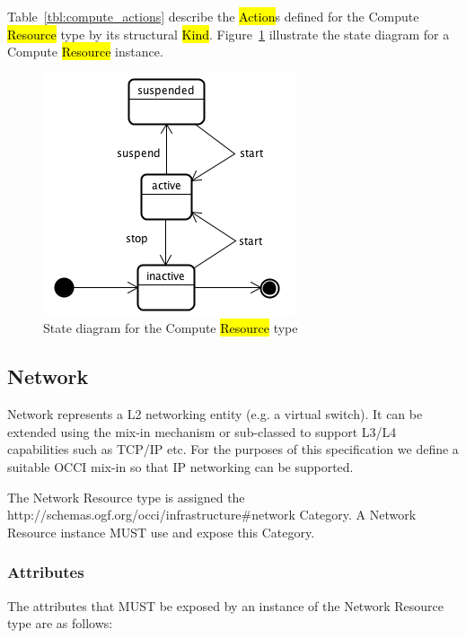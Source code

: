 \documentclass[10pt,a4paper]{article}
\begin{document}
Table~\ref{tbl:compute_actions} describe the \hl{Action}s defined for the
Compute \hl{Resource} type by its structural \hl{Kind}.
%
%
Figure~\ref{fig:compute_state} illustrate the state diagram for a Compute
\hl{Resource} instance.

\begin{figure}[!h]
	\centering
	\includegraphics[scale=0.4]{figs/compute-state.png}
	\caption{State diagram for the Compute \hl{Resource} type}
	\label{fig:compute_state}
\end{figure}

\subsection{Network}
Network represents a L2 networking entity (e.g. a virtual switch). It can be extended using the mix-in mechanism or sub-classed to support L3/L4 capabilities such as TCP/IP etc. For the purposes of this specification we define a suitable OCCI mix-in so that IP networking can be supported. 

The Network Resource type is assigned the http://schemas.ogf.org/occi/infrastructure\#network Category. A Network Resource instance MUST use and expose this Category.

\subsubsection{Attributes}
The attributes that MUST be exposed by an instance of the Network Resource type are as follows:
\end{document}
